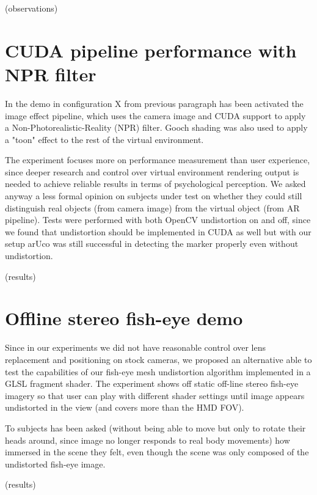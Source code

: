 (observations)

\section{CUDA pipeline performance with NPR filter}
In the demo in configuration X from previous paragraph has been activated the image effect pipeline, which uses the camera image and CUDA support to apply a Non-Photorealistic-Reality (NPR) filter. Gooch shading was also used to apply a "toon" effect to the rest of the virtual environment.

The experiment focuses more on performance measurement than user experience, since deeper research and control over virtual environment rendering output is needed to achieve reliable results in terms of psychological perception. We asked anyway a less formal opinion on subjects under test on whether they could still distinguish real objects (from camera image) from the virtual object (from AR pipeline). Tests were performed with both OpenCV undistortion on and off, since we found that undistortion should be implemented in CUDA as well but with our setup arUco was still successful in detecting the marker properly even without undistortion.

(results)


\section{Offline stereo fish-eye demo}
Since in our experiments we did not have reasonable control over lens replacement and positioning on stock cameras, we proposed an alternative able to test the capabilities of our fish-eye mesh undistortion algorithm implemented in a GLSL fragment shader. The experiment shows off static off-line stereo fish-eye imagery so that user can play with different shader settings until image appears undistorted in the view (and covers more than the HMD FOV).

To subjects has been asked (without being able to move but only to rotate their heads around, since image no longer responds to real body movements) how immersed in the scene they felt, even though the scene was only composed of the undistorted fish-eye image.

(results)



